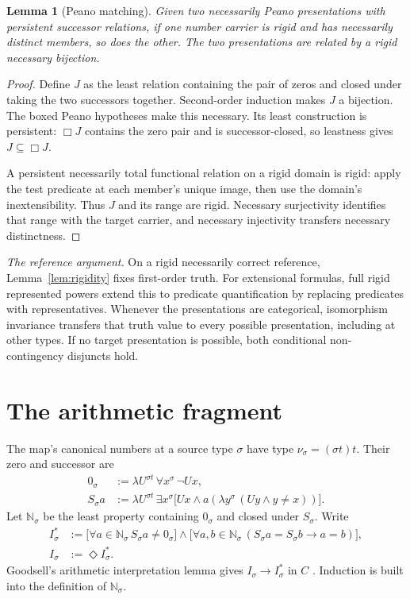 \documentclass[11pt,letterpaper,numbers=noenddot]{scrartcl}
\numberwithin{equation}{section}
\newtheorem{lemma}[theorem]{Lemma}
\theoremstyle{definition}
\newcommand{\Ns}{\mathbb N}
\begin{document}
\begin{lemma}[Peano matching]\label{lem:peano-match}
Given two necessarily Peano presentations with persistent successor relations, if one number carrier is rigid and has necessarily distinct members, so does the other. The two presentations are related by a rigid necessary bijection.
\end{lemma}

\begin{proof}
Define $J$ as the least relation containing the pair of zeros and closed under taking the two successors together. Second-order induction makes $J$ a bijection. The boxed Peano hypotheses make this necessary. Its least construction is persistent: $\Box J$ contains the zero pair and is successor-closed, so leastness gives $J\subseteq\Box J$.

A persistent necessarily total functional relation on a rigid domain is rigid: apply the test predicate at each member's unique image, then use the domain's inextensibility. Thus $J$ and its range are rigid. Necessary surjectivity identifies that range with the target carrier, and necessary injectivity transfers necessary distinctness.
\end{proof}

\emph{The reference argument.}
On a rigid necessarily correct reference, Lemma~\ref{lem:rigidity} fixes first-order truth. For extensional formulas, full rigid represented powers extend this to predicate quantification by replacing predicates with representatives. Whenever the presentations are categorical, isomorphism invariance transfers that truth value to every possible presentation, including at other types. If no target presentation is possible, both conditional non-contingency disjuncts hold.

\section{The arithmetic fragment}

The map's canonical numbers at a source type $\sigma$ have type
$\nu_\sigma=(\sigma t)t$. Their zero and successor are
\begin{align*}
0_\sigma&:=\lambda U^{\sigma t}\,\forall x^\sigma\,\neg Ux,\\
S_\sigma a&:=\lambda U^{\sigma t}\,\exists x^\sigma
 \bigl[Ux\land a(\lambda y^\sigma\,(Uy\land y\ne x))\bigr].
\end{align*}
Let $\Ns_\sigma$ be the least property containing $0_\sigma$ and closed under $S_\sigma$. Write
\begin{align}
I_\sigma^*&:=
 \bigl[\forall a\in\Ns_\sigma\,S_\sigma a\ne0_\sigma\bigr]
 \land
 \bigl[\forall a,b\in\Ns_\sigma\,
 (S_\sigma a=S_\sigma b\to a=b)\bigr],\label{eq:istar}\\
I_\sigma&:=\Diamond I_\sigma^*.
\end{align}
Goodsell's arithmetic interpretation lemma gives $I_\sigma\to I_\sigma^*$ in $C$ \cite[Lemma 1]{goodsell}. Induction is built into the definition of $\Ns_\sigma$.
\end{document}
